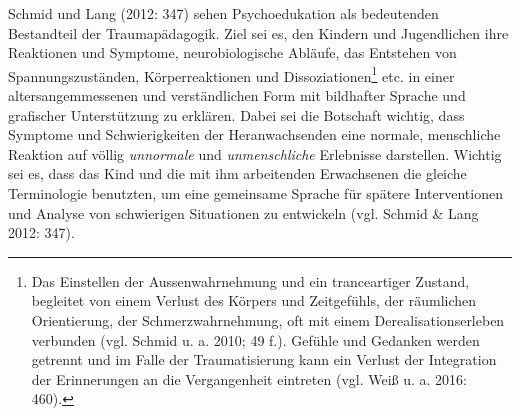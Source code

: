 Schmid und Lang (2012: 347) sehen Psychoedukation als bedeutenden Bestandteil der Traumap{\"a}dagogik. Ziel sei es, den Kindern und Jugendlichen ihre Reaktionen und Symptome, neurobiologische Abl{\"a}ufe, das Entstehen von Spannungszust{\"a}nden, K{\"o}rperreaktionen und Dissoziationen\footnote{Das Einstellen der Aussenwahrnehmung und ein tranceartiger Zustand, begleitet von einem Verlust des Körpers und Zeitgefühls, der räumlichen Orientierung, der Schmerzwahrnehmung, oft mit einem Derealisationserleben verbunden (vgl. Schmid u. a. 2010; 49 f.). Gefühle und Gedanken werden getrennt und im Falle der Traumatisierung kann ein Verlust der Integration der Erinnerungen an die Vergangenheit eintreten (vgl. Weiß u. a. 2016: 460).} etc. in einer altersangemmessenen und verständlichen Form mit bildhafter Sprache und grafischer Unterstützung zu erklären. Dabei sei die Botschaft wichtig, dass Symptome und Schwierigkeiten der Heranwachsenden eine normale, menschliche Reaktion auf v{\"o}llig \textit{unnormale} und \textit{unmenschliche} Erlebnisse darstellen. Wichtig sei es, dass das Kind und die mit ihm arbeitenden Erwachsenen die gleiche Terminologie benutzten, um eine gemeinsame Sprache für spätere Interventionen und Analyse von schwierigen Situationen zu entwickeln (vgl. Schmid \& Lang 2012: 347).

